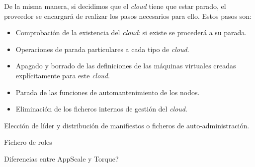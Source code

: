 De la misma manera, si decidimos que el \emph{cloud} tiene que estar parado, el proveedor se encargará de realizar los pasos necesarios para ello. Estos pasos son:
\begin{itemize}
\item Comprobación de la existencia del \emph{cloud}: si existe se procederá a su parada.
\item Operaciones de parada particulares a cada tipo de \emph{cloud}.
\item Apagado y borrado de las definiciones de las máquinas virtuales creadas explícitamente para este \emph{cloud}.
\item Parada de las funciones de automantenimiento de los nodos.
\item Eliminación de los ficheros internos de gestión del \emph{cloud}.
\end{itemize}

Elección de líder y distribución de manifiestos o ficheros de auto-administración.

Fichero de roles

Diferencias entre AppScale y Torque?
